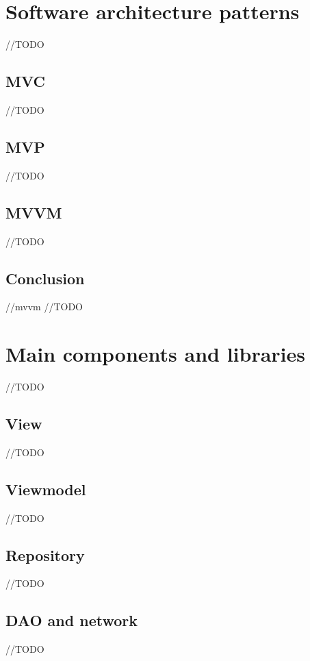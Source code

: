 \section{Software architecture patterns}
//TODO

\subsection{MVC}
//TODO

\subsection{MVP}
//TODO

\subsection{MVVM}
//TODO

\subsection{Conclusion}
//mvvm
//TODO

\section{Main components and libraries}
//TODO

\subsection{View}
//TODO

\subsection{Viewmodel}
//TODO

\subsection{Repository}
//TODO

\subsection{DAO and network}
//TODO